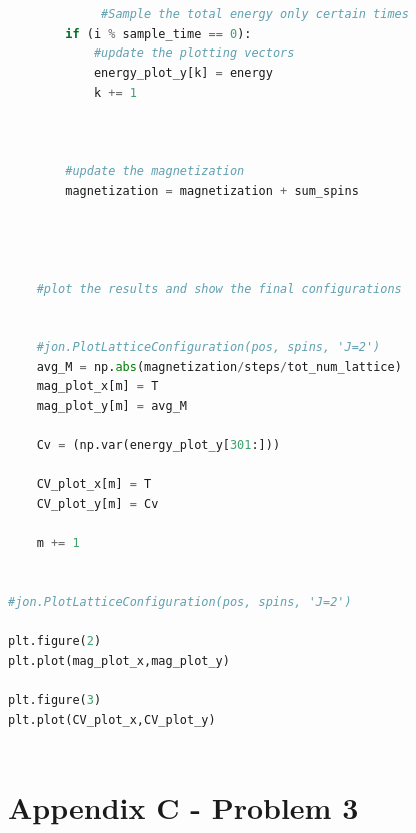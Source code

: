 \documentclass{article}
\begin{document}
\begin{lstlisting}[language=Python]
            
            
             #Sample the total energy only certain times
        if (i % sample_time == 0):
            #update the plotting vectors
            energy_plot_y[k] = energy
            k += 1
    
                
            
        #update the magnetization
        magnetization = magnetization + sum_spins
        
            
            
            
    #plot the results and show the final configurations
       
    
    #jon.PlotLatticeConfiguration(pos, spins, 'J=2')  
    avg_M = np.abs(magnetization/steps/tot_num_lattice)
    mag_plot_x[m] = T
    mag_plot_y[m] = avg_M
    
    Cv = (np.var(energy_plot_y[301:]))

    CV_plot_x[m] = T
    CV_plot_y[m] = Cv

    m += 1

    
#jon.PlotLatticeConfiguration(pos, spins, 'J=2')   

plt.figure(2)
plt.plot(mag_plot_x,mag_plot_y) 

plt.figure(3)
plt.plot(CV_plot_x,CV_plot_y) 



\end{lstlisting}

\newpage

\section*{Appendix C - Problem 3}
\end{document}
